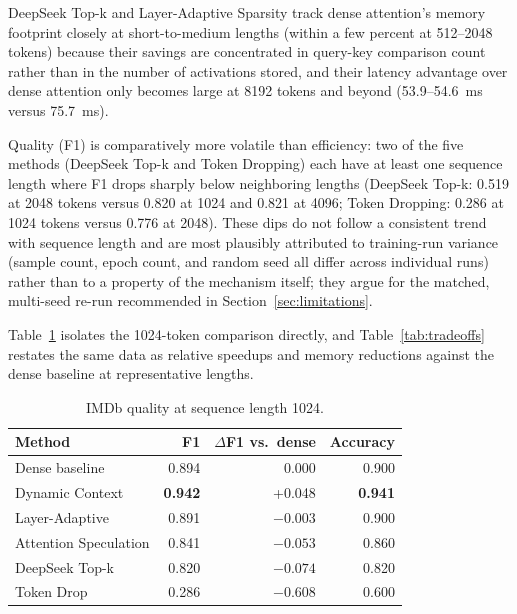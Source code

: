\documentclass[11pt]{article}
\begin{document}
DeepSeek Top-k and Layer-Adaptive Sparsity track dense attention's memory footprint closely at short-to-medium lengths (within a few percent at 512--2048 tokens) because their savings are concentrated in query-key comparison count rather than in the number of activations %
stored, and their latency advantage over dense attention only becomes large
at 8192 tokens and beyond (53.9--54.6~ms versus 75.7~ms).

Quality (F1) is comparatively more volatile than efficiency: two of the five methods (DeepSeek Top-k and Token
Dropping) each have at least one sequence length where F1 drops sharply below neighboring lengths (DeepSeek Top-k: 0.519 at 2048 tokens versus 0.820 at 1024 and 0.821 at 4096; Token Dropping: 0.286 at 1024 tokens versus 0.776 at 2048).
These dips do not follow a consistent trend with sequence length and are most plausibly attributed to training-run variance (sample count, epoch count, and random seed all differ across individual runs) rather than to a
property of the mechanism itself; they argue for the matched, multi-seed re-run recommended in Section~\ref{sec:limitations}.

Table~\ref{tab:quality-1024} isolates the 1024-token comparison directly, and
Table~\ref{tab:tradeoffs} restates the same data as relative speedups and
memory reductions against the dense baseline at representative lengths.

\begin{table}[H]
  \centering
  \small
  \caption{IMDb quality at sequence length 1024.}
  \label{tab:quality-1024}
  \begin{tabular}{@{}lrrr@{}}
    \toprule
    Method & F1 & $\Delta$F1 vs.\ dense & Accuracy \\
    \midrule
    Dense baseline & 0.894 & 0.000 & 0.900 \\
    Dynamic Context & \textbf{0.942} & +0.048 & \textbf{0.941} \\
    Layer-Adaptive & 0.891 & $-0.003$ & 0.900 \\
    Attention Speculation & 0.841 & $-0.053$ & 0.860 \\
    DeepSeek Top-k & 0.820 & $-0.074$ & 0.820 \\
    Token Drop & 0.286 & $-0.608$ & 0.600 \\
    \bottomrule
  \end{tabular}
\end{table}
\end{document}
